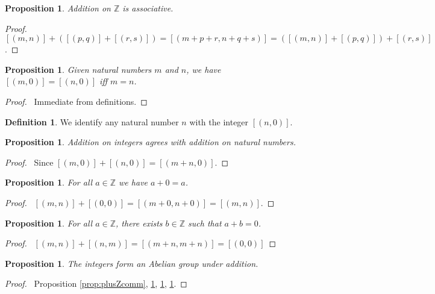 \documentclass{book}
\let\qed\relax
\newtheorem{prop}[ax]{Proposition}
\theoremstyle{definition}
\newtheorem{df}[ax]{Definition}
\begin{document}
\begin{prop}
\label{prop:plusZassoc}
Addition on $\mathbb{Z}$ is associative.
\end{prop}

\begin{proof}
\pf\ $[(m,n)] + ([(p,q)] + [(r,s)]) = [(m+p+r,n+q+s)] = ([(m,n)] + [(p,q)]) + [(r,s)]$. \qed
\end{proof}

\begin{prop}
Given natural numbers $m$ and $n$, we have $[(m,0)] = [(n,0)]$ iff $m = n$.
\end{prop}

\begin{proof}
\pf\ Immediate from definitions. \qed
\end{proof}

\begin{df}
We identify any natural number $n$ with the integer $[(n,0)]$.
\end{df}

\begin{prop}
Addition on integers agrees with addition on natural numbers.
\end{prop}

\begin{proof}
\pf\ Since $[(m,0)] + [(n,0)] = [(m+n,0)]$. \qed
\end{proof}

\begin{prop}
\label{prop:plusZzero}
For all $a \in \mathbb{Z}$ we have $a + 0 = a$.
\end{prop}

\begin{proof}
\pf\ $[(m,n)] + [(0,0)] = [(m+0,n+0)] = [(m,n)]$. \qed
\end{proof}

\begin{prop}
\label{prop:plusZinv}
For all $a \in \mathbb{Z}$, there exists $b \in \mathbb{Z}$ such that $a + b = 0$.
\end{prop}

\begin{proof}
\pf\ $[(m,n)] + [(n,m)] = [(m+n,m+n)] = [(0,0)]$ \qed
\end{proof}

\begin{prop}
\label{prop:Zgroup}
The integers form an Abelian group under addition.
\end{prop}

\begin{proof}
\pf\ Proposition \ref{prop:plusZcomm}, \ref{prop:plusZassoc}, \ref{prop:plusZzero}, \ref{prop:plusZinv}. \qed
\end{proof}
\end{document}
